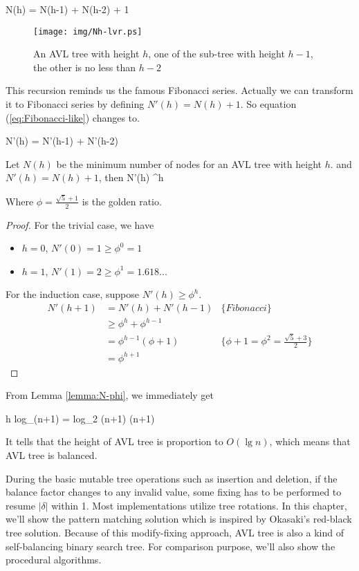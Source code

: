 \documentclass{article}
\begin{document}
\be
  N(h) = N(h-1) + N(h-2) + 1
  \label{eq:Fibonacci-like}
\ee

\begin{figure}[htbp]
   \centering
   \texttt{[image: img/Nh-lvr.ps]}
   \caption{An AVL tree with height $h$, one of the sub-tree with height $h-1$, the other is no less than $h-2$} \label{fig:N-h-relation}
\end{figure}

This recursion reminds us the famous Fibonacci series. Actually we can
transform it to Fibonacci series by defining $N'(h) = N(h)+1$. So equation
(\ref{eq:Fibonacci-like}) changes to.

\be
  N'(h) = N'(h-1) + N'(h-2)
\ee

\begin{lemma}
\label{lemma:N-phi}
Let $N(h)$ be the minimum number of nodes for an AVL tree with
height $h$. and $N'(h) = N(h) + 1$, then
\be
  N'(h) \geq \phi^h
\ee

Where $\phi = \frac{\sqrt{5}+1}{2}$ is the golden ratio.
\end{lemma}

\begin{proof}
For the trivial case, we have
\begin{itemize}
\item $h=0$, $N'(0) = 1 \geq \phi^0 = 1$
\item $h=1$, $N'(1) = 2 \geq \phi^1 = 1.618...$
\end{itemize}

For the induction case, suppose $N'(h) \geq \phi^h$.
\[
  \begin{array}{lll}
  N'(h+1) & = N'(h) + N'(h-1) & \{Fibonacci\} \\
          & \geq \phi^h + \phi^{h-1} & \\
          & = \phi^{h-1}(\phi + 1) & \{\phi + 1 = \phi^2 = \frac{\sqrt{5}+3}{2}\} \\
          & = \phi^{h+1}
 \end{array}
\]
\end{proof}

From Lemma \ref{lemma:N-phi}, we immediately get

\be
  h \leq log_{\phi}(n+1) = log_{\phi}2 \cdot \lg (n+1)  \lg (n+1)
  \label{eq:AVL-height}
\ee

It tells that the height of AVL tree is proportion to $O(\lg n)$, which
means that AVL tree is balanced.

During the basic mutable tree operations such as insertion and deletion,
if the balance factor changes to any invalid value, some fixing has
to be performed to resume $|\delta|$ within 1. Most implementations utilize
tree rotations. In this chapter, we'll show the pattern matching solution
which is inspired by Okasaki's red-black tree solution\cite{okasaki}.
Because of this modify-fixing approach, AVL tree is also a kind of
self-balancing binary search tree. For comparison purpose, we'll also
show the procedural algorithms.
\end{document}

